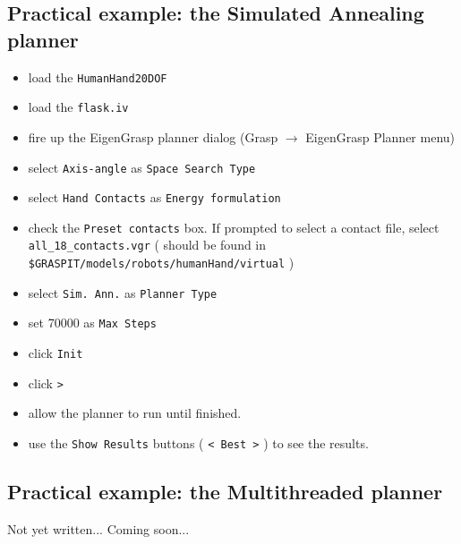 \subsection{Practical example: the Simulated Annealing planner}
\begin{itemize}
\item load the \texttt{HumanHand20DOF}
\item load the \texttt{flask.iv}
\item fire up the EigenGrasp planner dialog (Grasp $\rightarrow$ EigenGrasp
  Planner menu)
\item select \texttt{Axis-angle} as \texttt{Space Search Type}
\item select \texttt{Hand Contacts} as \texttt{Energy formulation}
\item check the \texttt{Preset contacts} box. If prompted to select a
  contact file, select \texttt{all\_18\_contacts.vgr} ( should be
  found in \texttt{\$GRASPIT/models/robots/humanHand/virtual} )
\item select \texttt{Sim. Ann.} as \texttt{Planner Type}
\item set 70000 as \texttt{Max Steps}
\item click \texttt{Init}
\item click \texttt{>}
\item allow the planner to run until finished.
\item use the \texttt{Show Results} buttons ( \texttt{< Best >} ) to
  see the results.
\end{itemize}

\subsection{Practical example: the Multithreaded planner}

Not yet written... Coming soon...
